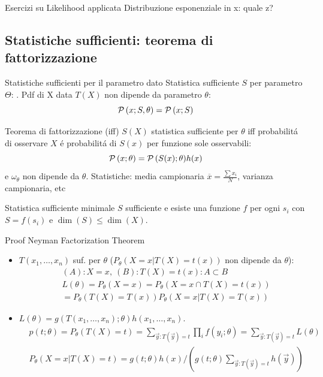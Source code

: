\documentclass[asd-beamer.tex]{subfiles}
\begin{document}
\begin{frame}{Esercizi su Likelihood applicata}
Distribuzione esponenziale in x: quale z?
\end{frame}

\subsection{Statistiche sufficienti: teorema di fattorizzazione}

\begin{frame}{Statistiche sufficienti per il parametro dato}
Statistica sufficiente $S$ per parametro $\Theta$: . Pdf di X data $T(X)$ non dipende da parametro $\theta$:
\[\operatorname{\mathcal{P}}{(x;S,\theta)}=\operatorname{\mathcal{P}}{(x;S)}\]
\begin{block}{Teorema di fattorizzazione (iff)}
$S(X)$ statistica sufficiente per $\theta$ iff probabilit\'a di osservare $X$ \'e probabilit\'a di $S(x)$ per funzione sole osservabili: \[\operatorname{\mathcal{P}}{(x;\theta)}=\operatorname{\mathcal{P}}{(S(x);\theta)}h(x)\] e $\omega_{\theta}$ non dipende da $\theta$.
Statistiche: media campionaria $\overline{x}=\frac{\sum x_i}{N}$, varianza campionaria, etc
\end{block}
\begin{block}{Statistica sufficiente minimale}
$S$ sufficiente e esiste una funzione $f$ per ogni $s_i$ con $S=f(s_i)$ e $\dim({S})\leq\dim{(X)}$.
\end{block}
\end{frame}

\begin{frame}{Proof Neyman Factorization Theorem}
\begin{itemize}
\item $T(x_1,\ldots,x_n)$ suf. per $\theta$ ($P_{\theta}(X=x|T(X)=t(x))$ non dipende da $\theta$):
\begin{align*}
&(A): X=x,\ (B): T(X)=t(x): A\subset B\\
&L(\theta)=P_{\theta}(X=x)=P_{\theta}(X=x\cap T(X)=t(x))\\
&=P_{\theta}(T(X)=T(x))P_{\theta}(X=x|T(X)=T(x))
\end{align*}
\item $L(\theta)=g(T(x_1,\ldots,x_n);\theta)h(x_1,\ldots,x_n)$.
\begin{align*}
&p(t;\theta)=P_{\theta}(T(X)=t)=\sum_{\vec{y}:T(\vec{y})=t}\prod_if(y_i;\theta)=\sum_{\vec{y}:T(\vec{y})=t}L(\theta)\\
&P_{\theta}(X=x|T(X)=t)=g(t;\theta)h(x)/(g(t;\theta)\sum_{\vec{y}:T(\vec{y})=t}h(\vec{y}))
\end{align*}
\end{itemize}
\end{frame}
\end{document}
